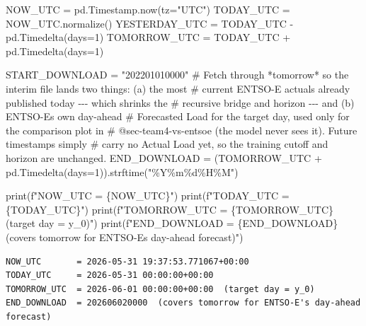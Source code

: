 \documentclass[
  english,
  letterpaper,
]{scrbook}
\newenvironment{Shaded}{\begin{snugshade}}{\end{snugshade}}
\newcommand{\BuiltInTok}[1]{\textcolor[rgb]{0.00,0.23,0.31}{#1}}
\newcommand{\CommentTok}[1]{\textcolor[rgb]{0.37,0.37,0.37}{#1}}
\newcommand{\DecValTok}[1]{\textcolor[rgb]{0.68,0.00,0.00}{#1}}
\newcommand{\NormalTok}[1]{\textcolor[rgb]{0.00,0.23,0.31}{#1}}
\newcommand{\OperatorTok}[1]{\textcolor[rgb]{0.37,0.37,0.37}{#1}}
\newcommand{\SpecialCharTok}[1]{\textcolor[rgb]{0.37,0.37,0.37}{#1}}
\newcommand{\SpecialStringTok}[1]{\textcolor[rgb]{0.13,0.47,0.30}{#1}}
\newcommand{\StringTok}[1]{\textcolor[rgb]{0.13,0.47,0.30}{#1}}
\begin{document}
\protect{}\label{team4-constants}
\begin{Shaded}
\begin{Highlighting}[]
\NormalTok{NOW\_UTC }\OperatorTok{=}\NormalTok{ pd.Timestamp.now(tz}\OperatorTok{=}\StringTok{"UTC"}\NormalTok{)}
\NormalTok{TODAY\_UTC }\OperatorTok{=}\NormalTok{ NOW\_UTC.normalize()}
\NormalTok{YESTERDAY\_UTC }\OperatorTok{=}\NormalTok{ TODAY\_UTC }\OperatorTok{{-}}\NormalTok{ pd.Timedelta(days}\OperatorTok{=}\DecValTok{1}\NormalTok{)}
\NormalTok{TOMORROW\_UTC }\OperatorTok{=}\NormalTok{ TODAY\_UTC }\OperatorTok{+}\NormalTok{ pd.Timedelta(days}\OperatorTok{=}\DecValTok{1}\NormalTok{)}

\NormalTok{START\_DOWNLOAD }\OperatorTok{=} \StringTok{"202201010000"}
\CommentTok{\# Fetch through *tomorrow* so the interim file lands two things: (a) the most}
\CommentTok{\# current ENTSO{-}E actuals already published today {-}{-}{-} which shrinks the}
\CommentTok{\# recursive bridge and horizon {-}{-}{-} and (b) ENTSO{-}E\textquotesingle{}s own day{-}ahead}
\CommentTok{\# \textasciigrave{}Forecasted Load\textasciigrave{} for the target day, used only for the comparison plot in}
\CommentTok{\# @sec{-}team4{-}vs{-}entsoe (the model never sees it). Future timestamps simply}
\CommentTok{\# carry no Actual Load yet, so the training cutoff and horizon are unchanged.}
\NormalTok{END\_DOWNLOAD }\OperatorTok{=}\NormalTok{ (TOMORROW\_UTC }\OperatorTok{+}\NormalTok{ pd.Timedelta(days}\OperatorTok{=}\DecValTok{1}\NormalTok{)).strftime(}\StringTok{"\%Y\%m}\SpecialCharTok{\%d}\StringTok{\%H\%M"}\NormalTok{)}

\BuiltInTok{print}\NormalTok{(}\SpecialStringTok{f"NOW\_UTC       = }\SpecialCharTok{\{}\NormalTok{NOW\_UTC}\SpecialCharTok{\}}\SpecialStringTok{"}\NormalTok{)}
\BuiltInTok{print}\NormalTok{(}\SpecialStringTok{f"TODAY\_UTC     = }\SpecialCharTok{\{}\NormalTok{TODAY\_UTC}\SpecialCharTok{\}}\SpecialStringTok{"}\NormalTok{)}
\BuiltInTok{print}\NormalTok{(}\SpecialStringTok{f"TOMORROW\_UTC  = }\SpecialCharTok{\{}\NormalTok{TOMORROW\_UTC}\SpecialCharTok{\}}\SpecialStringTok{  (target day = y\_0)"}\NormalTok{)}
\BuiltInTok{print}\NormalTok{(}\SpecialStringTok{f"END\_DOWNLOAD  = }\SpecialCharTok{\{}\NormalTok{END\_DOWNLOAD}\SpecialCharTok{\}}\SpecialStringTok{  (covers tomorrow for ENTSO{-}E\textquotesingle{}s day{-}ahead forecast)"}\NormalTok{)}
\end{Highlighting}
\end{Shaded}

\begin{verbatim}
NOW_UTC       = 2026-05-31 19:37:53.771067+00:00
TODAY_UTC     = 2026-05-31 00:00:00+00:00
TOMORROW_UTC  = 2026-06-01 00:00:00+00:00  (target day = y_0)
END_DOWNLOAD  = 202606020000  (covers tomorrow for ENTSO-E's day-ahead forecast)
\end{verbatim}
\end{document}
